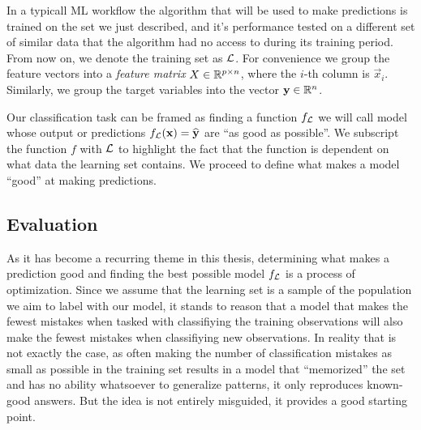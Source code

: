 In a typicall ML workflow the algorithm that will be used to make predictions is
trained on the set we just described, and it's performance tested on a different
set of similar data that the algorithm had no access to during its training
period. From now on, we denote the training set as $\mathcal{L}$. For convenience we
group the feature vectors into a \textit{feature matrix} $X \in \mathbb{R}^{p \times
n}$, where the $i$-th column is $\vec{x}_i$. Similarly, we group the target
variables into the vector $\mathbf{y} \in \mathbb{R}^{n}$.

Our classification task can be framed as finding a function $f_{\mathcal{L}}$ we will
call model whose output or predictions $f_{\mathcal{L}} (\mathbf{x}) = \widehat{\mathbf{y}}$ are
``as good as possible''. We subscript the function $f$ with $\mathcal{L}$ to highlight the
fact that the function is dependent on what data the learning set contains. We
proceed to define what makes a model ``good'' at making predictions.

\subsection{Evaluation}
As it has become a recurring theme in this thesis,
determining what makes a prediction good and finding the best possible model
$f_{\mathcal{L}}$ is a process of optimization. Since we assume that the learning set is a
sample of the population we aim to label with our model, it stands to reason
that a model that makes the fewest mistakes when tasked with classifiying the
training observations will also make the fewest mistakes when classifiying new
observations. In reality that is not exactly the case, as often making the
number of classification mistakes as small as possible in the training set
results in a model that ``memorized'' the set and has no ability whatsoever to
generalize patterns, it only reproduces known-good answers. But the idea is not
entirely misguided, it provides a good starting point.



